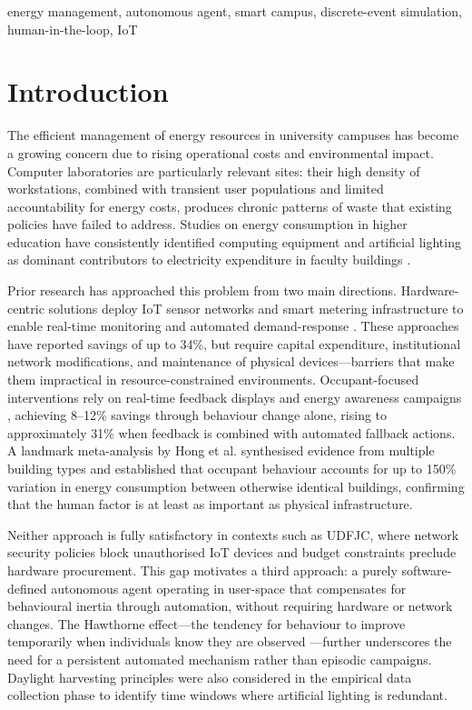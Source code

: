 \documentclass[conference]{IEEEtran}
\begin{document}
\begin{IEEEkeywords}
energy management, autonomous agent, smart campus, discrete-event simulation, human-in-the-loop, IoT
\end{IEEEkeywords}

\section{Introduction}

The efficient management of energy resources in university campuses has become a growing concern due to rising operational costs and environmental impact. Computer laboratories are particularly relevant sites: their high density of workstations, combined with transient user populations and limited accountability for energy costs, produces chronic patterns of waste that existing policies have failed to address. Studies on energy consumption in higher education have consistently identified computing equipment and artificial lighting as dominant contributors to electricity expenditure in faculty buildings \cite{meza2023, abad2015, doblari}.

Prior research has approached this problem from two main directions. Hardware-centric solutions deploy IoT sensor networks and smart metering infrastructure to enable real-time monitoring and automated demand-response \cite{franco2025}. These approaches have reported savings of up to 34\%, but require capital expenditure, institutional network modifications, and maintenance of physical devices—barriers that make them impractical in resource-constrained environments. Occupant-focused interventions rely on real-time feedback displays and energy awareness campaigns \cite{bull2018}, achieving 8–12\% savings through behaviour change alone, rising to approximately 31\% when feedback is combined with automated fallback actions. A landmark meta-analysis by Hong et al. \cite{hong2016} synthesised evidence from multiple building types and established that occupant behaviour accounts for up to 150\% variation in energy consumption between otherwise identical buildings, confirming that the human factor is at least as important as physical infrastructure.

Neither approach is fully satisfactory in contexts such as UDFJC, where network security policies block unauthorised IoT devices and budget constraints preclude hardware procurement. This gap motivates a third approach: a purely software-defined autonomous agent operating in user-space that compensates for behavioural inertia through automation, without requiring hardware or network changes. The Hawthorne effect—the tendency for behaviour to improve temporarily when individuals know they are observed \cite{jones1992}—further underscores the need for a persistent automated mechanism rather than episodic campaigns. Daylight harvesting principles \cite{williams2012} were also considered in the empirical data collection phase to identify time windows where artificial lighting is redundant.
\end{document}
